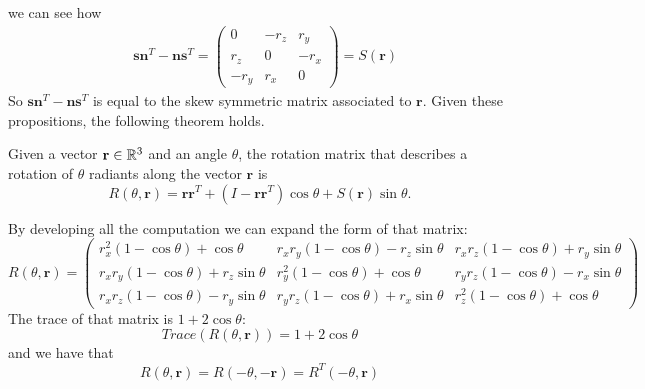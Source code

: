 \documentclass[10pt, letterpaper]{report}
\begin{document}
we can see how \begin{align}
    &\mathbf s\mathbf n^T-\mathbf n\mathbf s^T=\begin{pmatrix}
        0&-r_z&r_y\\
        r_z&0&-r_x\\ 
        -r_y&r_x&0 
    \end{pmatrix}=S(\mathbf r)
\end{align}
So $\mathbf s\mathbf n^T-\mathbf n\mathbf s^T$ is equal to the skew symmetric matrix associated to $\mathbf r$. Given these propositions, the following theorem holds.\begin{theorem}
    Given a vector $\mathbf r\in {\mathbb R}^3$ and an angle $\theta$, the rotation matrix that describes a rotation of $\theta$ radiants along the vector $\mathbf r$ is\begin{equation}
        R(\theta,\mathbf r)=\mathbf r\mathbf r^T+(I-\mathbf r\mathbf r^T)\cos\theta +S(\mathbf r)\sin\theta.
    \end{equation}
\end{theorem}
By developing all the computation we can expand the form of that matrix:\begin{equation}
     R(\theta,\mathbf r)=\begin{pmatrix}
r_x^2(1 - \cos \theta) + \cos \theta & r_x r_y(1 - \cos \theta) - r_z \sin \theta & r_x r_z(1 - \cos \theta) + r_y \sin \theta \\
r_x r_y(1 - \cos \theta) + r_z \sin \theta & r_y^2(1 - \cos \theta) + \cos \theta & r_y r_z(1 - \cos \theta) - r_x \sin \theta \\
r_x r_z(1 - \cos \theta) - r_y \sin \theta & r_y r_z(1 - \cos \theta) + r_x \sin \theta & r_z^2(1 - \cos \theta) + \cos \theta
\end{pmatrix}
\end{equation}
The trace of that matrix is $1+2\cos\theta$:\begin{equation}
    Trace(R(\theta,\mathbf r))=1+2\cos\theta
\end{equation}
and we have that\begin{equation}
    R(\theta,\mathbf r)=R(-\theta,-\mathbf r)=R^T(-\theta,\mathbf r)
\end{equation}
\end{document}
